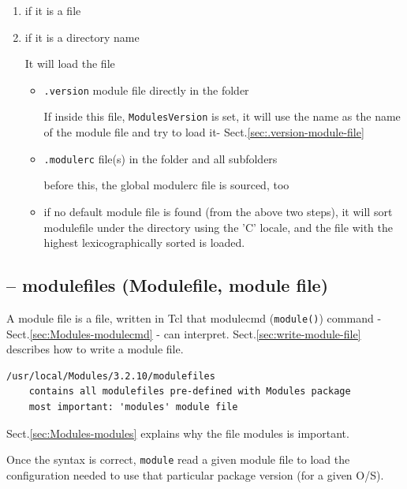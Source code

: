 \begin{enumerate}
  \item if it is a file
  
  \item if it is a directory name
  
It will load the file 
\begin{itemize}
  \item \verb!.version! module file directly in the folder

If inside this file, \verb!ModulesVersion! is set, it will use the name as the
name of the module file and try to load it- Sect.\ref{sec:.version-module-file}

  \item \verb!.modulerc! file(s) in the folder and all subfolders

before this, the global modulerc file is sourced, too


   \item if no default module file is found (from the above two steps), it will
   sort modulefile under the directory using the 'C'
   locale, and the file with the highest lexicographically sorted is loaded.  
\end{itemize}  
  
\end{enumerate}



\subsection{-- modulefiles (Modulefile, module file)}
\label{sec:modulefiles}

A module file is a file, written in Tcl that modulecmd (\verb!module()!) command 
- Sect.\ref{sec:Modules-modulecmd} - can interpret. 
Sect.\ref{sec:write-module-file} describes how to write a module file.

\begin{mdframed}
\begin{verbatim}
/usr/local/Modules/3.2.10/modulefiles
	contains all modulefiles pre-defined with Modules package
	most important: 'modules' module file
\end{verbatim}
Sect.\ref{sec:Modules-modules} explains why the file modules is important.

\end{mdframed}

Once the syntax is correct, \verb!module! read a given module file to
load the configuration needed to use that particular package version (for a
given O/S). 


